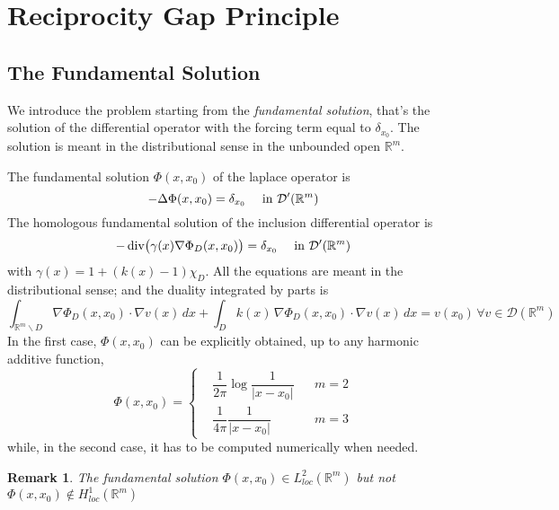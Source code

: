 \documentclass[10pt, a4paper, twoside, openright]{book}
\theoremstyle{definition}
\theoremstyle{plain}
\theoremstyle{plain}
\theoremstyle{plain}
\theoremstyle{plain}
\newtheorem{remark}[subsection]{Remark}
\theoremstyle{plain}
\theoremstyle{plain}
\theoremstyle{plain}
\theoremstyle{plain}
\DeclareMathOperator{\divergence}{div}
\begin{document}
\section{Reciprocity Gap Principle}
\subsection{The Fundamental Solution}
\label{subsection:fundamental-solution}
We introduce the problem starting from the \emph{fundamental solution}, that's the solution of the differential operator with the forcing term equal to $\delta_{x_0}$.
The solution is meant in the distributional sense in the unbounded open $\mathbb{R}^m$. 
\par
The fundamental solution $\Phi(x,x_0)$ of the laplace operator is
\begin{equation}
 - \Delta \Phi(x,x_0) = \delta_{x_0} \quad \textup{ in }\mathcal{D}'(\mathbb{R}^m)\label{eq:fundamental-in-dist}
\end{equation}
The homologous fundamental solution of the inclusion differential operator is
\begin{equation}
 - \divergence\bigl(\gamma(x)\nabla \Phi_D(x,x_0)\bigr) = \delta_{x_0}\quad\textup{ in }\mathcal{D}'(\mathbb{R}^m)\label{eq:fundamental-D-in-dist}
\end{equation}
with $\gamma(x) = 1+(k(x)-1)\chi_D$. 
All the equations are meant in the distributional sense; and the duality integrated by parts is
\begin{equation}
 \int_{\mathbb{R}^m \backslash D}\nabla \Phi_D(x,x_0) \cdot \nabla v(x) \, dx + \int_{D} k(x) \, \nabla \Phi_D(x,x_0) \cdot \nabla v(x) \, dx = v(x_0) \, \forall v \in \mathcal{D}(\mathbb{R}^m)
\end{equation}
In the first case, $\Phi(x,x_0)$ can be explicitly obtained, up to any harmonic additive function,
\begin{equation}
\label{eq:definition-Phi-23}
  \Phi(x,x_0)=
  \left\{
  \begin{aligned}
   &\dfrac{1}{2\pi}\log\dfrac{1}{| x - x_0|} && m=2 \\
   &\dfrac{1}{4\pi}\dfrac{1}{| x  - x_0|} && m=3 
  \end{aligned}
  \right.
\end{equation}
while, in the second case, it has to be computed numerically when needed.
\par
\begin{remark}
 The fundamental solution $\Phi(x,x_0)\in L^2_{loc}(\mathbb{R}^m)$ but not $\Phi(x,x_0)\notin H^1_{loc}(\mathbb{R}^m)$
\end{remark}
\end{document}
